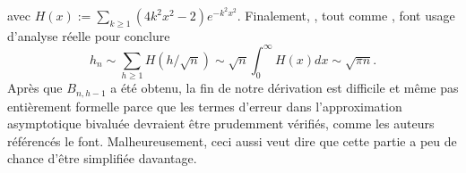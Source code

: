 avec \(H(x) := \sum_{k \geqslant
  1}(4k^2x^2-2)e^{-k^2x^2}\). Finalement,
\citet*[5.9]{SedgewickFlajolet_1996}, tout comme
\citet*[9.6]{GrahamKnuthPatashnik_1994}, font usage d'analyse réelle
pour conclure
\begin{equation*}
h_{n} \sim \sum_{h \geqslant 1}H(h/\!\sqrt{n})
\sim \sqrt{n} \int_0^{\infty}\!\!H(x) dx \sim \sqrt{\pi n}.
\end{equation*}
Après que \(B_{n,h-1}\) a été obtenu, la fin de notre dérivation est
difficile et même pas entièrement formelle parce que les termes
d'erreur dans l'approximation asymptotique bivaluée devraient être
prudemment vérifiés, comme les auteurs référencés le
font. Malheureusement, ceci aussi veut dire que cette partie a peu de
chance d'être simplifiée davantage.
